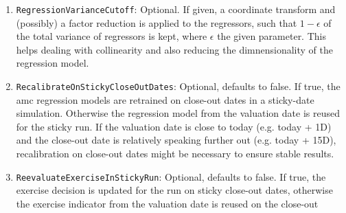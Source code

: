 \documentclass[12pt, a4paper]{article}
\begin{document}
\begin{enumerate}
  If not given, it defaults to \verb+Simple+. For an observation date the full model state observed on this date is
  included in the regressor. In any case only past states are included to the extend that these past states were also
  used in the cashflow generation phase. Depending on the choice the regressor is built as follows:
  \begin{itemize}
    \item \verb+Simple+: No past states are included though.
    \item \verb+Lagged+: In addition, past IR, FX and EQ states that are relevant for future cashflows are included.
    \item \verb+LaggedIR+: In addition, past IR states that are relevant for future cashflows are included. For example,
      for an Overnight Indexed cashflow the IR states observed on fixing dates are included.
    \item \verb+LaggedFX+: In addition, past FX states that are relevant for future cashflows are included. For example,
      for a FX resettable cashflow the FX state observed on the FX reset date is included.
    \item \verb+LaggedEQ+: In addition, past EQ states that are relevant for future cashflows are included. For example,
      for an EQ indexed cashflow the EQ state observed on the EQ fixing date is included.
  \end{itemize}
\item \verb+RegressionVarianceCutoff+: Optional. If given, a coordinate transform and (possibly) a factor reduction is
  applied to the regressors, such that $1-\epsilon$ of the total variance of regressors is kept, where $\epsilon$ the
  given parameter. This helps dealing with collinearity and also reducing the dimnensionality of the regression model.
\item \verb+RecalibrateOnStickyCloseOutDates+: Optional, defaults to false. If true, the amc regression models are
  retrained on close-out dates in a sticky-date simulation. Otherwise the regression model from the valuation date is
  reused for the sticky run. If the valuation date is close to today (e.g. today + 1D) and the close-out date is
  relatively speaking further out (e.g. today + 15D), recalibration on close-out dates might be necessary to ensure
  stable results.
\item \verb+ReevaluateExerciseInStickyRun+: Optional, defaults to false. If true, the exercise decision is updated for
  the run on sticky close-out dates, otherwise the exercise indicator from the valuation date is reused on the close-out

\end{enumerate}
\end{document}
